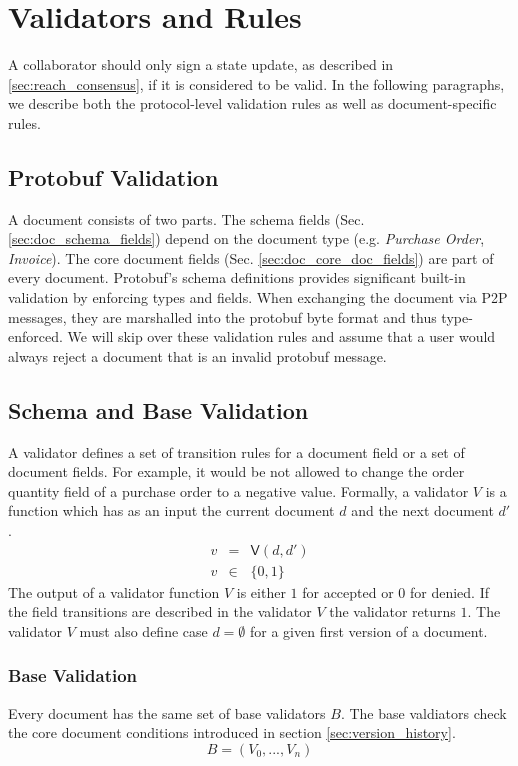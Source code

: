 \section{Validators and Rules}\label{sec:doc_validation}
A collaborator should only sign a state update, as described in \ref{sec:reach_consensus}, if it is considered to be valid. In the following paragraphs, we describe both the protocol-level validation rules as well as document-specific rules.

\subsection{Protobuf Validation}
A document consists of two parts. The schema fields (Sec. \ref{sec:doc_schema_fields}) depend on the document type (e.g. \textit{Purchase Order}, \textit{Invoice}). The core document fields (Sec. \ref{sec:doc_core_doc_fields}) are part of every document. Protobuf's schema definitions provides significant built-in validation by enforcing types and fields. When exchanging the document via P2P messages, they are marshalled into the protobuf byte format and thus type-enforced. We will skip over these validation rules and assume that a user would always reject a document that is an invalid protobuf message.

\subsection{Schema and Base Validation}
A validator defines a set of transition rules for a document field or a set of document fields. For example, it would be not allowed to change the order quantity field of a purchase order to a negative value. Formally, a validator $V$ is a function which has as an input the current document $d$ and the next document $d'$.
\begin{eqnarray}
v & = & \mathsf{V}(d, d') \\
 v &\in & \{0,1\}
\end{eqnarray}
The output of a validator function $V$ is either $1$ for accepted or $0$ for denied. If the field transitions are described in the validator $V$ the validator returns $1$.
The validator $V$ must also define case $d = \emptyset$ for a given first version of a document. 
\subsubsection{Base Validation}
Every document has the same set of base validators $B$. The base valdiators check the core document conditions introduced in section \ref{sec:version_history}. 
\begin{equation}
     B = (V_0,...,V_n) 
\end{equation}
